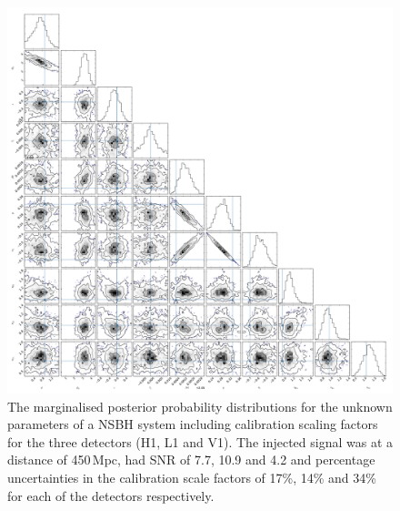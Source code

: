 \documentclass[10pt]{iopart}
\begin{document}
\begin{figure}
 \begin{center}
  \includegraphics[width=1.0\textwidth]{nsbh_post_fig.pdf}
 \end{center}
 \caption{\label{fig:nsbhpost} The marginalised posterior probability distributions for the unknown
 parameters of a \ac{NSBH} system including calibration scaling factors for the three detectors 
(H1, L1 and V1). The injected signal was at a distance of 450\,Mpc, had \ac{SNR} of 7.7, 10.9 and 
4.2 and percentage uncertainties in the calibration scale factors of 17\%, 14\% and 34\% for each of 
the detectors respectively.}
\end{figure}
\end{document}
